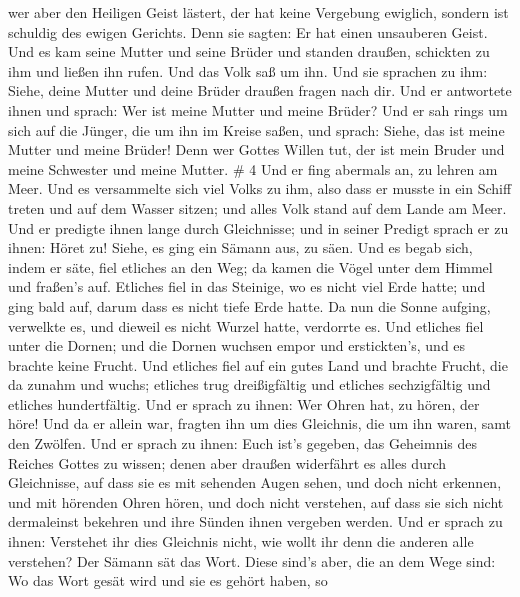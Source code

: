  wer aber den Heiligen Geist lästert, der hat keine
Vergebung ewiglich, sondern ist schuldig des ewigen Gerichts.
 Denn sie sagten: Er hat einen unsauberen Geist.
 Und es kam seine Mutter und seine Brüder und standen
draußen, schickten zu ihm und ließen ihn rufen.  Und das
Volk saß um ihn. Und sie sprachen zu ihm: Siehe, deine Mutter und deine
Brüder draußen fragen nach dir.  Und er antwortete ihnen
und sprach: Wer ist meine Mutter und meine Brüder?  Und er
sah rings um sich auf die Jünger, die um ihn im Kreise saßen, und
sprach: Siehe, das ist meine Mutter und meine Brüder!  Denn
wer Gottes Willen tut, der ist mein Bruder und meine Schwester und meine
Mutter. \# 4  Und er fing abermals an, zu lehren am Meer.
Und es versammelte sich viel Volks zu ihm, also dass er musste in ein
Schiff treten und auf dem Wasser sitzen; und alles Volk stand auf dem
Lande am Meer.  Und er predigte ihnen lange durch
Gleichnisse; und in seiner Predigt sprach er zu ihnen: 
Höret zu! Siehe, es ging ein Sämann aus, zu säen.  Und es
begab sich, indem er säte, fiel etliches an den Weg; da kamen die Vögel
unter dem Himmel und fraßen's auf.  Etliches fiel in das
Steinige, wo es nicht viel Erde hatte; und ging bald auf, darum dass es
nicht tiefe Erde hatte.  Da nun die Sonne aufging, verwelkte
es, und dieweil es nicht Wurzel hatte, verdorrte es.  Und
etliches fiel unter die Dornen; und die Dornen wuchsen empor und
erstickten's, und es brachte keine Frucht.  Und etliches
fiel auf ein gutes Land und brachte Frucht, die da zunahm und wuchs;
etliches trug dreißigfältig und etliches sechzigfältig und etliches
hundertfältig.  Und er sprach zu ihnen: Wer Ohren hat, zu
hören, der höre!  Und da er allein war, fragten ihn um dies
Gleichnis, die um ihn waren, samt den Zwölfen.  Und er
sprach zu ihnen: Euch ist's gegeben, das Geheimnis des Reiches Gottes zu
wissen; denen aber draußen widerfährt es alles durch Gleichnisse,
 auf dass sie es mit sehenden Augen sehen, und doch nicht
erkennen, und mit hörenden Ohren hören, und doch nicht verstehen, auf
dass sie sich nicht dermaleinst bekehren und ihre Sünden ihnen vergeben
werden.  Und er sprach zu ihnen: Verstehet ihr dies
Gleichnis nicht, wie wollt ihr denn die anderen alle verstehen?
 Der Sämann sät das Wort.  Diese sind's aber,
die an dem Wege sind: Wo das Wort gesät wird und sie es gehört haben, so
